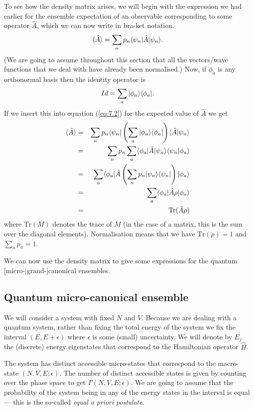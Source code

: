 \documentclass{article}
\begin{document}
To see how the density matrix arises, we will begin with the expression we had earlier for the ensemble expectation of an observable corresponding to some operator $\hat{A}$, which we can now write in bra-ket notation.
\begin{equation}
	\langle\hat{A}\rangle = \sum_n p_n\langle \psi_n |\hat{A}| \psi_n \rangle.
	\label{eq:7.2}
\end{equation}
(We are going to assume throughout this section that all the vectors/wave functions that we deal with have already been normalised.) Now, if $\phi_a$ is any orthonormal basis then the identity operator is
$$
	Id = \sum_a| \phi_a \rangle\langle \phi_a |.
$$
If we insert this into equation (\ref{eq:7.2}) for the expected value of $\hat{A}$ we get
\begin{eqnarray*}
	\langle\hat{A}\rangle &=& \sum_n p_n\langle \psi_n | \left(\sum_a| \phi_a \rangle\langle \phi_a |\right) |\hat{A}| \psi_n \rangle\\
	&=& \sum_n p_n\sum_a\langle \phi_a |\hat{A}| \psi_n \rangle\langle \psi_n | \phi_a\rangle\\
	&=& \sum_a \langle \phi_a |\hat{A} \left(\sum_n p_n | \psi_n \rangle\langle \psi_n |\right)| \phi_a \rangle\\
	&=& \sum_a \langle \phi_a |\hat{A}\rho| \phi_a \rangle\\
	&=& \text{Tr}(\hat{A}\rho)
\end{eqnarray*}
where $\text{Tr}(M)$ denotes the trace of $M$ (in the case of a matrix, this is the sum over the diagonal elements).
Normalisation means that we have $\text{Tr}(\rho)=1$ and $\sum_n p_n=1$.

We can now use the density matrix to give some expressions for the quantum [micro-$|$grand-]canonical ensembles.

\subsection*{Quantum micro-canonical ensemble}
We will consider a system with fixed $N$ and $V$. Because we are dealing with a quantum system, rather than fixing the total energy of the system we fix the interval $(E,E+\epsilon)$ where $\epsilon$ is some (small) uncertainty. We will denote by $E_j$ the (discrete) energy eigenstates that correspond to the Hamiltonian operator $\hat{H}$.

The system has distinct accessible micro-states that correspond to the macro-state $(N,V,E;\epsilon)$. The number of distinct accessible states is given by counting over the phase space to get $\Gamma(N,V,E;\epsilon)$. We are going to assume that the probability of the system being in any of the energy states in the interval is equal --- this is the so-called \emph{equal a priori postulate}.
\end{document}
